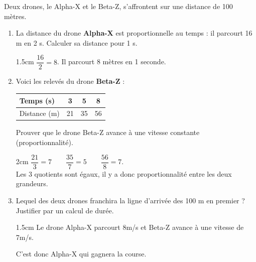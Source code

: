 \documentclass[a4paper]{book}
\begin{document}
{    \begin{exercice}
        Deux drones, le Alpha-X et le Beta-Z, s'affrontent sur une distance de 100 mètres.

        \begin{enumerate}
            \item La distance du drone \textbf{Alpha-X} est proportionnelle au temps : il parcourt 16 m en 2 s. Calculer sa distance pour 1 s.

            \begin{ZoneReponse}{1.5cm}
                $\dfrac{16}{2}=8$. Il parcourt 8 mètres en 1 seconde.
            \end{ZoneReponse}
            
            \item Voici les relevés du drone \textbf{Beta-Z} :
            \begin{center}
            \begin{tabular}{|l|c|c|c|}
            \hline
            Temps (s) & 3 & 5 & 8 \\ \hline
            Distance (m) & 21 & 35 & 56 \\ \hline
            \end{tabular}
            \end{center}
            Prouver que le drone Beta-Z avance à une vitesse constante (proportionnalité).

            \begin{ZoneReponse}{2cm}
                $\dfrac{21}{3}=7 \quad \quad \dfrac{35}{7}=5 \quad \quad \dfrac{56}{8}=7$.\\[1ex]
                Les 3 quotients sont égaux, il y a donc proportionnalité entre les deux grandeurs.
            \end{ZoneReponse}
            
            \item Lequel des deux drones franchira la ligne d'arrivée des 100 m en premier ? Justifier par un calcul de durée.

            \begin{ZoneReponse}{1.5cm}
                Le drone Alpha-X parcourt 8m/s et Beta-Z avance à une vitesse de 7m/s.

                C'est donc Alpha-X qui gagnera la course.
            \end{ZoneReponse}
        \end{enumerate}
    \end{exercice}
        

}
\end{document}
